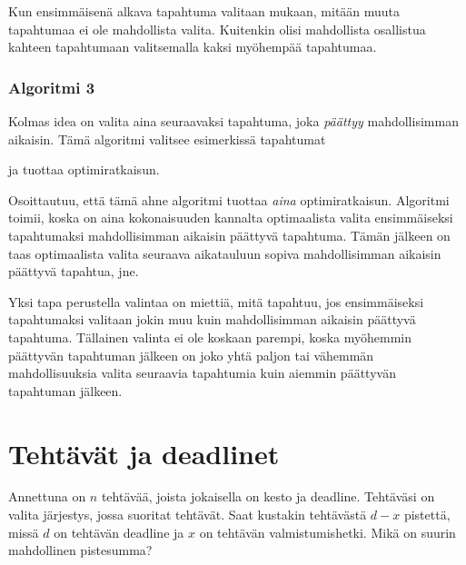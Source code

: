 Kun ensimmäisenä alkava tapahtuma
valitaan mukaan, mitään muuta tapahtumaa
ei ole mahdollista valita.
Kuitenkin olisi mahdollista osallistua
kahteen tapahtumaan valitsemalla
kaksi myöhempää tapahtumaa.

\subsubsection*{Algoritmi 3}

Kolmas idea on valita aina seuraavaksi tapahtuma,
joka \emph{päättyy} mahdollisimman aikaisin.
Tämä algoritmi valitsee esimerkissä tapahtumat
\\
\begin{center}
\end{center}
ja tuottaa optimiratkaisun.

Osoittautuu, että tämä ahne algoritmi
tuottaa \textit{aina} optimiratkaisun.
Algoritmi toimii, koska on aina kokonaisuuden
kannalta optimaalista valita
ensimmäiseksi tapahtumaksi
mahdollisimman aikaisin päättyvä tapahtuma.
Tämän jälkeen on taas optimaalista
valita seuraava aikatauluun sopiva
mahdollisimman aikaisin
päättyvä tapahtua, jne.

Yksi tapa perustella valintaa on miettiä,
mitä tapahtuu, jos ensimmäiseksi tapahtumaksi
valitaan jokin muu kuin mahdollisimman
aikaisin päättyvä tapahtuma.
Tällainen valinta ei ole koskaan parempi,
koska myöhemmin päättyvän tapahtuman
jälkeen on joko yhtä paljon tai vähemmän
mahdollisuuksia valita seuraavia tapahtumia
kuin aiemmin päättyvän tapahtuman jälkeen.

\section{Tehtävät ja deadlinet}

\begin{task}
Annettuna on $n$ tehtävää,
joista jokaisella on kesto ja deadline.
Tehtäväsi on valita järjestys,
jossa suoritat tehtävät.
Saat kustakin tehtävästä $d-x$ pistettä,
missä $d$ on tehtävän deadline ja $x$
on tehtävän valmistumishetki.
Mikä on suurin mahdollinen pistesumma?
\end{task}

